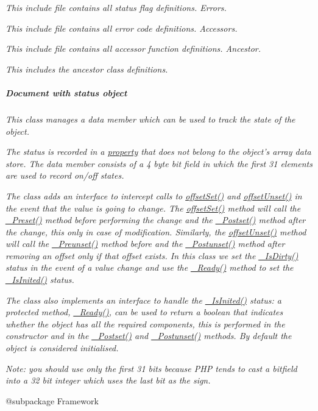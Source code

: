 {\itshape This include file contains all status flag definitions. Errors.}

{\itshape This include file contains all error code definitions. Accessors.}

{\itshape This include file contains all accessor function definitions. Ancestor.}

{\itshape This includes the ancestor class definitions. \subparagraph*{Document with status object}}

{\itshape }

{\itshape This class manages a data member which can be used to track the state of the object.}

{\itshape The status is recorded in a \hyperlink{}{property} that does not belong to the object's array data store. The data member consists of a 4 byte bit field in which the first 31 elements are used to record on/off states.}

{\itshape The class adds an interface to intercept calls to \hyperlink{}{offset\-Set()} and \hyperlink{}{offset\-Unset()} in the event that the value is going to change. The \hyperlink{}{offset\-Set()} method will call the \hyperlink{}{\-\_\-\-Preset()} method before performing the change and the \hyperlink{}{\-\_\-\-Postset()} method after the change, this only in case of modification. Similarly, the \hyperlink{}{offset\-Unset()} method will call the \hyperlink{}{\-\_\-\-Preunset()} method before and the \hyperlink{}{\-\_\-\-Postunset()} method after removing an offset only if that offset exists. In this class we set the \hyperlink{}{\-\_\-\-Is\-Dirty()} status in the event of a value change and use the \hyperlink{}{\-\_\-\-Ready()} method to set the \hyperlink{}{\-\_\-\-Is\-Inited()} status.}

{\itshape The class also implements an interface to handle the \hyperlink{}{\-\_\-\-Is\-Inited()} status\-: a protected method, \hyperlink{}{\-\_\-\-Ready()}, can be used to return a boolean that indicates whether the object has all the required components, this is performed in the constructor and in the \hyperlink{}{\-\_\-\-Postset()} and \hyperlink{}{\-\_\-\-Postunset()} methods. By default the object is considered initialised.}

{\itshape {\itshape Note\-: you should use only the first 31 bits because P\-H\-P tends to cast a bitfield into a 32 bit integer which uses the last bit as the sign.}}

{\itshape \begin{DoxyVerb} @subpackage        Framework\end{DoxyVerb}
}

